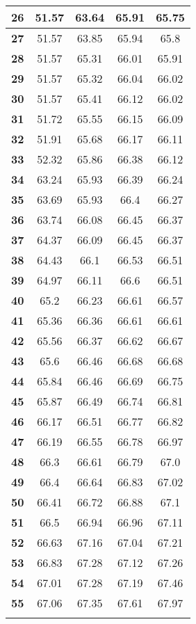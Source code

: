 \begin{longtable}{|c|c|c|c|c|}
\textbf{26} & 51.57 & 63.64 & 65.91 & 65.75 \\ \hline 
\textbf{27} & 51.57 & 63.85 & 65.94 & 65.8 \\ \hline 
\textbf{28} & 51.57 & 65.31 & 66.01 & 65.91 \\ \hline 
\textbf{29} & 51.57 & 65.32 & 66.04 & 66.02 \\ \hline 
\textbf{30} & 51.57 & 65.41 & 66.12 & 66.02 \\ \hline 
\textbf{31} & 51.72 & 65.55 & 66.15 & 66.09 \\ \hline 
\textbf{32} & 51.91 & 65.68 & 66.17 & 66.11 \\ \hline 
\textbf{33} & 52.32 & 65.86 & 66.38 & 66.12 \\ \hline 
\textbf{34} & 63.24 & 65.93 & 66.39 & 66.24 \\ \hline 
\textbf{35} & 63.69 & 65.93 & 66.4 & 66.27 \\ \hline 
\textbf{36} & 63.74 & 66.08 & 66.45 & 66.37 \\ \hline 
\textbf{37} & 64.37 & 66.09 & 66.45 & 66.37 \\ \hline 
\textbf{38} & 64.43 & 66.1 & 66.53 & 66.51 \\ \hline 
\textbf{39} & 64.97 & 66.11 & 66.6 & 66.51 \\ \hline 
\textbf{40} & 65.2 & 66.23 & 66.61 & 66.57 \\ \hline 
\textbf{41} & 65.36 & 66.36 & 66.61 & 66.61 \\ \hline 
\textbf{42} & 65.56 & 66.37 & 66.62 & 66.67 \\ \hline 
\textbf{43} & 65.6 & 66.46 & 66.68 & 66.68 \\ \hline 
\textbf{44} & 65.84 & 66.46 & 66.69 & 66.75 \\ \hline 
\textbf{45} & 65.87 & 66.49 & 66.74 & 66.81 \\ \hline 
\textbf{46} & 66.17 & 66.51 & 66.77 & 66.82 \\ \hline 
\textbf{47} & 66.19 & 66.55 & 66.78 & 66.97 \\ \hline 
\textbf{48} & 66.3 & 66.61 & 66.79 & 67.0 \\ \hline 
\textbf{49} & 66.4 & 66.64 & 66.83 & 67.02 \\ \hline 
\textbf{50} & 66.41 & 66.72 & 66.88 & 67.1 \\ \hline 
\textbf{51} & 66.5 & 66.94 & 66.96 & 67.11 \\ \hline 
\textbf{52} & 66.63 & 67.16 & 67.04 & 67.21 \\ \hline 
\textbf{53} & 66.83 & 67.28 & 67.12 & 67.26 \\ \hline 
\textbf{54} & 67.01 & 67.28 & 67.19 & 67.46 \\ \hline 
\textbf{55} & 67.06 & 67.35 & 67.61 & 67.97 \\ \hline 

    \caption[]{}
    \label{Tab:}
\end{longtable}